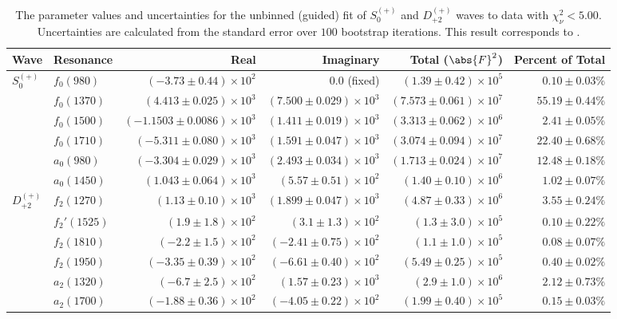 \begin{table}[ht]
    \begin{center}
        \begin{tabular}{llrrrr}\toprule
        Wave & Resonance & Real & Imaginary & Total ($\abs{F}^2$) & Percent of Total \\\midrule
$S_{0}^{(+)}$ & $f_{0}(980)$ & $(-3.73 \pm 0.44) \times 10^{2}$ & $0.0$ (fixed) & $(1.39 \pm 0.42) \times 10^{5}$ & $0.10 \pm 0.03 \%$ \\
 & $f_{0}(1370)$ & $(4.413 \pm 0.025) \times 10^{3}$ & $(7.500 \pm 0.029) \times 10^{3}$ & $(7.573 \pm 0.061) \times 10^{7}$ & $55.19 \pm 0.44 \%$ \\
 & $f_{0}(1500)$ & $(-1.1503 \pm 0.0086) \times 10^{3}$ & $(1.411 \pm 0.019) \times 10^{3}$ & $(3.313 \pm 0.062) \times 10^{6}$ & $2.41 \pm 0.05 \%$ \\
 & $f_{0}(1710)$ & $(-5.311 \pm 0.080) \times 10^{3}$ & $(1.591 \pm 0.047) \times 10^{3}$ & $(3.074 \pm 0.094) \times 10^{7}$ & $22.40 \pm 0.68 \%$ \\
 & $a_{0}(980)$ & $(-3.304 \pm 0.029) \times 10^{3}$ & $(2.493 \pm 0.034) \times 10^{3}$ & $(1.713 \pm 0.024) \times 10^{7}$ & $12.48 \pm 0.18 \%$ \\
 & $a_{0}(1450)$ & $(1.043 \pm 0.064) \times 10^{3}$ & $(5.57 \pm 0.51) \times 10^{2}$ & $(1.40 \pm 0.10) \times 10^{6}$ & $1.02 \pm 0.07 \%$ \\
$D_{+2}^{(+)}$ & $f_{2}(1270)$ & $(1.13 \pm 0.10) \times 10^{3}$ & $(1.899 \pm 0.047) \times 10^{3}$ & $(4.87 \pm 0.33) \times 10^{6}$ & $3.55 \pm 0.24 \%$ \\
 & $f_{2}'(1525)$ & $(1.9 \pm 1.8) \times 10^{2}$ & $(3.1 \pm 1.3) \times 10^{2}$ & $(1.3 \pm 3.0) \times 10^{5}$ & $0.10 \pm 0.22 \%$ \\
 & $f_{2}(1810)$ & $(-2.2 \pm 1.5) \times 10^{2}$ & $(-2.41 \pm 0.75) \times 10^{2}$ & $(1.1 \pm 1.0) \times 10^{5}$ & $0.08 \pm 0.07 \%$ \\
 & $f_{2}(1950)$ & $(-3.35 \pm 0.39) \times 10^{2}$ & $(-6.61 \pm 0.40) \times 10^{2}$ & $(5.49 \pm 0.25) \times 10^{5}$ & $0.40 \pm 0.02 \%$ \\
 & $a_{2}(1320)$ & $(-6.7 \pm 2.5) \times 10^{2}$ & $(1.57 \pm 0.23) \times 10^{3}$ & $(2.9 \pm 1.0) \times 10^{6}$ & $2.12 \pm 0.73 \%$ \\
 & $a_{2}(1700)$ & $(-1.88 \pm 0.36) \times 10^{2}$ & $(-4.05 \pm 0.22) \times 10^{2}$ & $(1.99 \pm 0.40) \times 10^{5}$ & $0.15 \pm 0.03 \%$ \\\bottomrule
        \end{tabular}
    \caption{The parameter values and uncertainties for the unbinned (guided) fit of $S_{0}^{(+)}$ and $D_{+2}^{(+)}$ waves to data with $\chi^2_\nu < 5.00$. Uncertainties are calculated from the standard error over $100$ bootstrap iterations. This result corresponds to .}\label{tab:unbinned-fit-chisqdof-5.0-guided-Sp0p-Dp2p}
    \end{center}
\end{table}
